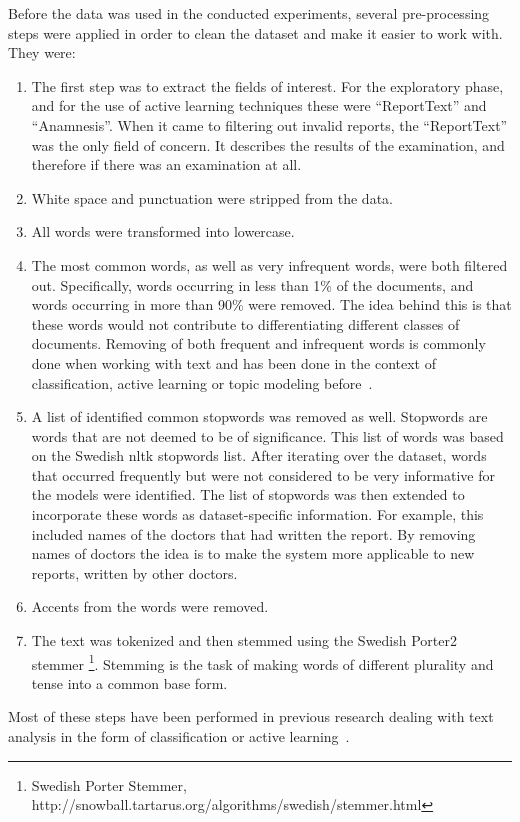 Before the data was used in the conducted experiments, several pre-processing steps were applied in order to clean the dataset and make it easier to work with.
They were:
\begin{enumerate}
    \item The first step was to extract the fields of interest.
          For the exploratory phase, and for the use of active learning techniques these were ``ReportText'' and ``Anamnesis''.
          When it came to filtering out invalid reports, the ``ReportText'' was the only field of concern.
          It describes the results of the examination, and therefore if there was an examination at all.
    \item White space and punctuation were stripped from the data.
    \item All words were transformed into lowercase.
    \item \label{enum:step-4} The most common words, as well as very infrequent words, were both filtered out.
          Specifically, words occurring in less than 1\% of the documents, and words occurring in more than 90\% were removed.
          The idea behind this is that these words would not contribute to differentiating different classes of documents.
          Removing of both frequent and infrequent words is commonly done when working with text and has been done in the context of classification, active learning or topic modeling before~\cite{tong2001support, blei2003latent, brinker2006active, sarioglu2013topic}.
    \item A list of identified common stopwords was removed as well.
          Stopwords are words that are not deemed to be of significance.
          This list of words was based on the Swedish nltk stopwords list.
          After iterating over the dataset, words that occurred frequently but were not considered to be very informative for the models were identified.
          The list of stopwords was then extended to incorporate these words as dataset-specific information.
          For example, this included names of the doctors that had written the report.
          By removing names of doctors the idea is to make the system more applicable to new reports, written by other doctors.
    \item Accents from the words were removed.
    \item The text was tokenized and then stemmed using the Swedish Porter2 stemmer \footnote{Swedish Porter Stemmer, http://snowball.tartarus.org/algorithms/swedish/stemmer.html}.
          Stemming is the task of making words of different plurality and tense into a common base form.
\end{enumerate}
Most of these steps have been performed in previous research  dealing with text analysis in the form of classification or active learning~\cite{tong2001support, blei2003latent, brinker2006active, sarioglu2013topic}.


